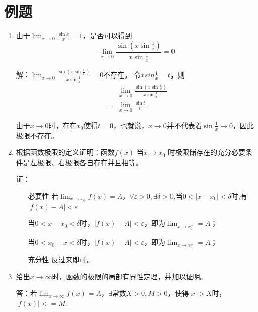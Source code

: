 \documentclass[UTF8]{ctexart}
\begin{document}
	\section{例题}
		\begin{enumerate}
			\item 
			由于$\lim_{x\rightarrow 0} \frac{\sin x}{x}=1$，是否可以得到
			$$
			\lim _{x\rightarrow 0}
			\frac{\sin(x\sin {\frac{1}{x}})}
			{x\sin{\frac{1}{x}}}=0
			$$
			
			解：$
			\lim _{x\rightarrow 0}
			\frac{\sin(x\sin {\frac{1}{x}})}
			{x\sin{\frac{1}{x}}}=0
			$不存在。	
			令$xsin \frac{1}{x}=t$，则
			\begin{equation}
				\begin{split}
					&\lim _{x\rightarrow 0}
					\frac{\sin(x\sin {\frac{1}{x}})}
					{x\sin{\frac{1}{x}}}\\
					=&\lim _{x\rightarrow 0}
					\frac{\sin t}{t}
				\end{split}
			\end{equation}
			
			由于$x\rightarrow 0$时，存在$x_0$使得$t=0$，也就说，$x\rightarrow 0$并不代表着$\sin{\frac{1}{x} \rightarrow 0}$，因此极限不存在。
			
			\item 
			
			根据函数极限的定义证明：函数$f(x)$ 当$x\rightarrow x_0$ 时极限储存在的充分必要条件是左极限、右极限各自存在并且相等。
			
			证：
			\begin{itemize}
				\item [必要性] 若$\lim _{x\rightarrow x_0}f(x)=A$，$\forall \varepsilon > 0, \exists \delta > 0$,当$0<|x-x_0|<\delta$时,有$|f(x)-A|<\varepsilon$.
				
				当$0<x-x_0<\delta$时，$|f(x)-A|<\varepsilon$，即为$\lim _{x \rightarrow x_0^+}=A$；
				
				当$0<x_0-x<\delta$时，$|f(x)-A|<\varepsilon$，即为$\lim _{x \rightarrow x_0^-}=A$；
				
				
				\item [充分性] 反过来即可。
			\end{itemize} 
			
			\item 给出$x\rightarrow \infty$时，函数的极限的局部有界性定理，并加以证明。
			
			答：若$\lim _{x\rightarrow \infty}f(x)=A$，$\exists$常数$ X > 0,M>0$，使得$|x|>X$时，$|f(x)|<=M$.
			

\end{enumerate}
\end{document}
